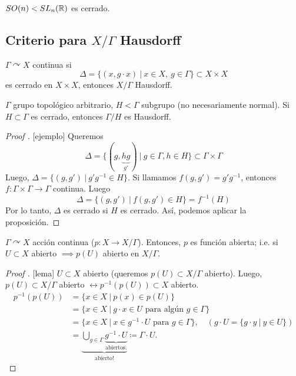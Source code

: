 \begin{remark}
	$SO(n) < SL_n(\mathbb{R})$ es cerrado.
\end{remark}

\subsection*{Criterio para $X / \Gamma$ Hausdorff}

\begin{prop}
	$\Gamma \curvearrowright X$ continua si
	\[ \Delta = \{ (x,g \cdot x) \ \big| \ x \in X,\ g \in \Gamma \} \subset X \times X \]
	es cerrado en $X \times X$, entonces $X / \Gamma$ Hausdorff.
\end{prop}

\begin{eg}
	$\Gamma$ grupo topológico arbitrario, $H < \Gamma$ subgrupo (no necesariamente normal). Si $H \subset \Gamma$ es cerrado, entonces $\Gamma / H$ es Hausdorff.
\end{eg}

\begin{proof}[Proof ][ejemplo]
	Queremos
	\[ \Delta = \{ (g,\underbrace{hg}_{g'}) \ \big| \ g \in \Gamma, h \in H \} \subset \Gamma \times \Gamma \]
	Luego, $\Delta = \{ (g,g') \ \big| \ g'g^{-1} \in H \}$. Si llamamos $f(g,g') = g'g^{-1}$, entonces $f : \Gamma \times \Gamma \to \Gamma$ continua. Luego
	\[ \Delta =  \{ (g,g') \ \big| \ f(g,g') \in H \} = f^{-1}(H) \]
	Por lo tanto, $\Delta$ es cerrado si $H$ es cerrado. Así, podemos aplicar la proposición.
\end{proof}

\begin{lemma}
	$\Gamma \curvearrowright X$ acción continua ($p : X \to X / \Gamma$). Entonces, $p$ es función abierta; i.e. si $U \subset X$ abierto $\implies p(U)$ abierto en $X / \Gamma$.
\end{lemma}
\begin{proof}[Proof ][lema]
	$U \subset X$ abierto (queremos $p(U) \subset X / \Gamma$ abierto). Luego, $p(U) \subset X / \Gamma$ abierto $\leftrightarrow p^{-1}(p(U)) \subset X$ abierto.
	\begin{align*}
		p^{-1}(p(U)) &= \{ x \in X \ \big| \ p(x) \in p(U) \} \\
		&= \{ x \in X \ \big| \ g\cdot x \in U \text{ para algún } g \in \Gamma \} \\
		&= \{ x \in X \ \big| \ x \in g^{-1} \cdot U \text{ para } g \in \Gamma \}, \quad (g \cdot U = \{g \cdot y \ | \ y \in U \})  \\
		&= \underbrace{\bigcup_{g\in\Gamma} \underbrace{g^{-1} \cdot U}_{\text{abiertos.}}}_{\text{abierto!}} \coloneq \Gamma \cdot U
	.\end{align*}
\end{proof}

